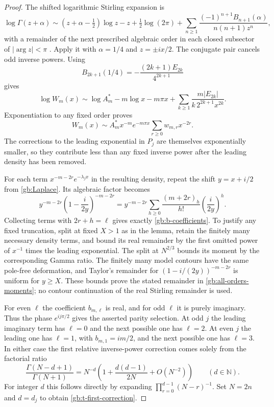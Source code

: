 \documentclass[11pt,a4paper]{article}
\numberwithin{equation}{section}
\theoremstyle{definition}
\theoremstyle{remark}
\begin{document}
\begin{proof}
The shifted logarithmic Stirling expansion is
\[
 \log\Gamma(z+\alpha)\sim
 (z+\alpha-\tfrac12)\log z-z+\tfrac12\log(2\pi)
 +\sum_{n\ge1}\frac{(-1)^{n+1}B_{n+1}(\alpha)}{n(n+1)z^n},
\]
with a remainder of the next prescribed algebraic order in each
closed subsector of $|\arg z|<\pi$ \cite{dlmf-stirling}.
Apply it with $\alpha=1/4$ and $z=\pm ix/2$.
The conjugate pair cancels odd inverse powers.  Using
\[
 B_{2k+1}(1/4)=-\frac{(2k+1)E_{2k}}{4^{2k+1}}
\]
gives
\[
 \log W_m(x)\sim
 \log A_m^*-m\log x-m\pi x
       +\sum_{k\ge1}\frac{m|E_{2k}|}{k\,2^{2k+1}x^{2k}}.
\]
Exponentiation to any fixed order proves
\begin{equation}\label{gb:W-all-orders}
 W_m(x)\sim A_m^*x^{-m}e^{-m\pi x}
                       \sum_{r\ge0}w_{m,r}x^{-2r}.
\end{equation}
The corrections to the leading exponential in $P_j$ are themselves
exponentially smaller, so they contribute less than any fixed
inverse power after the leading density has been removed.

For each term $x^{-m-2r}e^{-\lambda_jx}$ in the resulting density,
repeat the shift $y=x+i/2$ from \cref{gb:Laplace}.  Its algebraic
factor becomes
\[
 y^{-m-2r}\left(1-\frac{i}{2y}\right)^{-m-2r}
   =y^{-m-2r}\sum_{h\ge0}
       \frac{(m+2r)_h}{h!}\left(\frac{i}{2y}\right)^h.
\]
Collecting terms with $2r+h=\ell$ gives exactly
\eqref{gb:b-coefficients}.  To justify any fixed truncation, split
at fixed $X>1$ as in the lemma, retain the finitely many necessary
density terms, and bound its real remainder by the first omitted
power of $x^{-1}$ times the leading exponential.  The split at
$N^{2/3}$ bounds its moment by the corresponding Gamma ratio.
The finitely many model contours have the same pole-free deformation,
and Taylor's remainder for $(1-i/(2y))^{-m-2r}$ is uniform for
$y\ge X$.  These bounds prove the stated remainder in
\eqref{gb:all-orders-moments}; no contour continuation of the real
Stirling remainder is used.

For even $\ell$ the coefficient $b_{m,\ell}$ is real, and for
odd $\ell$ it is purely imaginary.  Thus the phase
$e^{ij\pi/2}$ gives the asserted parity selection.  At odd $j$
the leading imaginary term has $\ell=0$ and the next possible
one has $\ell=2$.  At even $j$ the leading one has $\ell=1$,
with $b_{m,1}=im/2$, and the next possible one has $\ell=3$.
In either case the first relative inverse-power correction comes
solely from the factorial ratio
\[
 \frac{\Gamma(N-d+1)}{\Gamma(N+1)}
 =N^{-d}\left(1+\frac{d(d-1)}{2N}+O(N^{-2})\right)
 \qquad(d\in\mathbb N).
\]
For integer $d$ this follows directly by expanding
$\prod_{r=0}^{d-1}(N-r)^{-1}$.  Set $N=2n$ and $d=d_j$
to obtain \eqref{gb:t-first-correction}.
\end{proof}
\end{document}
